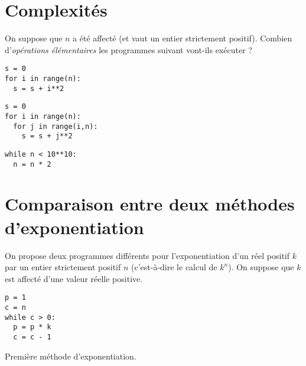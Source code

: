 \section{Complexités}

On suppose que $n$ a été affecté (et vaut un entier strictement positif). Combien d’\textit{opérations élémentaires} les programmes suivant vont-ils exécuter ?

\begin{boxedminipage}{\textwidth}
\begin{verbatim}
s = 0
for i in range(n):
  s = s + i**2
\end{verbatim}
\end{boxedminipage}


\begin{boxedminipage}{\textwidth}
\begin{verbatim}
s = 0
for i in range(n):
  for j in range(i,n):
    s = s + j**2
\end{verbatim}
\end{boxedminipage}

\begin{boxedminipage}{\textwidth}
\begin{verbatim}
while n < 10**10:
  n = n * 2
\end{verbatim}
\end{boxedminipage}



\section{Comparaison entre deux méthodes d'exponentiation}
\label{sec:ComparaisonExponentiation}

On propose deux programmes différents pour l'exponentiation d'un réel positif $k$ par un entier strictement positif $n$ (c'est-à-dire le calcul de $k^n$). On suppose que $k$ est affecté d'une valeur réelle positive.

\begin{listing}[!h]
\begin{verbatim}
p = 1
c = n
while c > 0:
  p = p * k
  c = c - 1
\end{verbatim}
\caption{Première méthode d'exponentiation.}
\label{prog:exponentiationnaive}
\end{listing}

